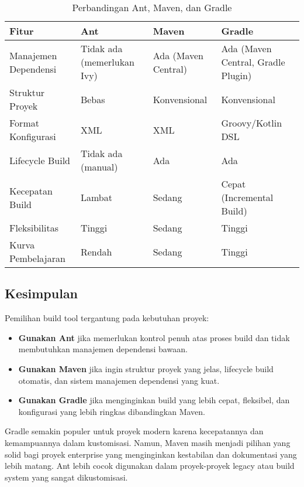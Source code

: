 \begin{table}[h]
	\centering
	\scriptsize
	\begin{tabular}{|p{}|p{}|p{}|p{}|}
		\hline
		\textbf{Fitur} & \textbf{Ant} & \textbf{Maven} & \textbf{Gradle} \\
		\hline
		Manajemen Dependensi & Tidak ada (memerlukan Ivy) & Ada (Maven Central) & Ada (Maven Central, Gradle Plugin) \\
		\hline
		Struktur Proyek & Bebas & Konvensional & Konvensional \\
		\hline
		Format Konfigurasi & XML & XML & Groovy/Kotlin DSL \\
		\hline
		Lifecycle Build & Tidak ada (manual) & Ada & Ada \\
		\hline
		Kecepatan Build & Lambat & Sedang & Cepat (Incremental Build) \\
		\hline
		Fleksibilitas & Tinggi & Sedang & Tinggi \\
		\hline
		Kurva Pembelajaran & Rendah & Sedang & Tinggi \\
		\hline
	\end{tabular}
	\caption{Perbandingan Ant, Maven, dan Gradle}
	\label{tab:comparison}
\end{table}

\subsection{Kesimpulan}
Pemilihan build tool tergantung pada kebutuhan proyek:
\begin{itemize}
	\item \textbf{Gunakan Ant} jika memerlukan kontrol penuh atas proses build dan tidak membutuhkan manajemen dependensi bawaan.
	\item \textbf{Gunakan Maven} jika ingin struktur proyek yang jelas, lifecycle build otomatis, dan sistem manajemen dependensi yang kuat.
	\item \textbf{Gunakan Gradle} jika menginginkan build yang lebih cepat, fleksibel, dan konfigurasi yang lebih ringkas dibandingkan Maven.
\end{itemize}

Gradle semakin populer untuk proyek modern karena kecepatannya dan kemampuannya dalam kustomisasi. Namun, Maven masih menjadi pilihan yang solid bagi proyek enterprise yang menginginkan kestabilan dan dokumentasi yang lebih matang. Ant lebih cocok digunakan dalam proyek-proyek legacy atau build system yang sangat dikustomisasi.




